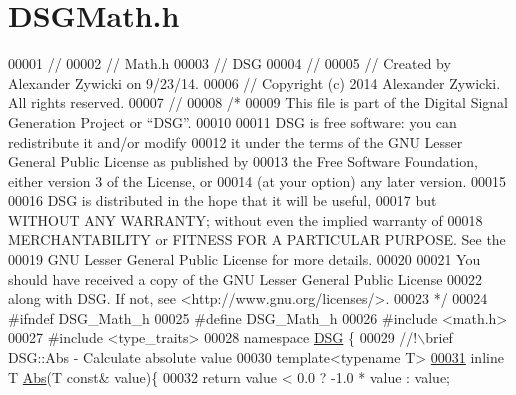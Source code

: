 \hypertarget{_d_s_g_math_8h_source}{\section{D\+S\+G\+Math.\+h}
\label{_d_s_g_math_8h_source}
}

\begin{DoxyCode}
00001 \textcolor{comment}{//}
00002 \textcolor{comment}{//  Math.h}
00003 \textcolor{comment}{//  DSG}
00004 \textcolor{comment}{//}
00005 \textcolor{comment}{//  Created by Alexander Zywicki on 9/23/14.}
00006 \textcolor{comment}{//  Copyright (c) 2014 Alexander Zywicki. All rights reserved.}
00007 \textcolor{comment}{//}
00008 \textcolor{comment}{/*}
00009 \textcolor{comment}{ This file is part of the Digital Signal Generation Project or “DSG”.}
00010 \textcolor{comment}{}
00011 \textcolor{comment}{ DSG is free software: you can redistribute it and/or modify}
00012 \textcolor{comment}{ it under the terms of the GNU Lesser General Public License as published by}
00013 \textcolor{comment}{ the Free Software Foundation, either version 3 of the License, or}
00014 \textcolor{comment}{ (at your option) any later version.}
00015 \textcolor{comment}{}
00016 \textcolor{comment}{ DSG is distributed in the hope that it will be useful,}
00017 \textcolor{comment}{ but WITHOUT ANY WARRANTY; without even the implied warranty of}
00018 \textcolor{comment}{ MERCHANTABILITY or FITNESS FOR A PARTICULAR PURPOSE.  See the}
00019 \textcolor{comment}{ GNU Lesser General Public License for more details.}
00020 \textcolor{comment}{}
00021 \textcolor{comment}{ You should have received a copy of the GNU Lesser General Public License}
00022 \textcolor{comment}{ along with DSG.  If not, see <http://www.gnu.org/licenses/>.}
00023 \textcolor{comment}{ */}
00024 \textcolor{preprocessor}{#ifndef DSG\_Math\_h}
00025 \textcolor{preprocessor}{#define DSG\_Math\_h}
00026 \textcolor{preprocessor}{#include <math.h>}
00027 \textcolor{preprocessor}{#include <type\_traits>}
00028 \textcolor{keyword}{namespace }\hyperlink{namespace_d_s_g}{DSG} \{\textcolor{comment}{}
00029 \textcolor{comment}{    //!\(\backslash\)brief DSG::Abs - Calculate absolute value}
00030 \textcolor{comment}{}    \textcolor{keyword}{template}<\textcolor{keyword}{typename} T>
\hypertarget{_d_s_g_math_8h_source_l00031}{}\hyperlink{namespace_d_s_g_a0af03bade7e25e8da80e3022af0e45a7}{00031}     \textcolor{keyword}{inline} T \hyperlink{namespace_d_s_g_a0af03bade7e25e8da80e3022af0e45a7}{Abs}(T \textcolor{keyword}{const}& value)\{
00032         \textcolor{keywordflow}{return} value < 0.0 ? -1.0 * value : value;

\end{DoxyCode}
